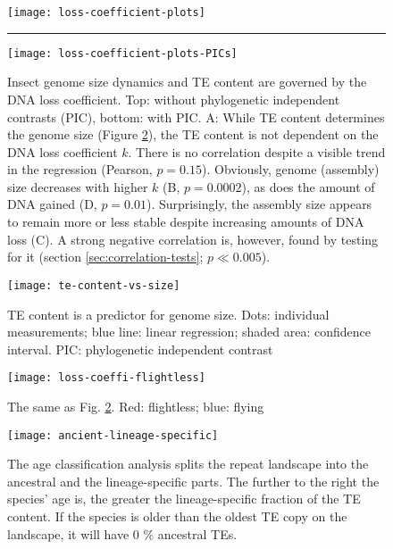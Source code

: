 \begin{figure}[h!]
\centering
\texttt{[image: loss-coefficient-plots]}
\rule{\textwidth}{0.2pt}

\bigskip

\texttt{[image: loss-coefficient-plots-PICs]}
\caption[DNA loss coefficient correlations, with and without PIC]{Insect genome size dynamics and TE content are governed by the DNA loss coefficient. Top: without phylogenetic independent contrasts (PIC), bottom: with PIC. A: While TE content determines the genome size (Figure \ref{fig:te-content-vs-size}), the TE content is not dependent on the DNA loss coefficient $k$. There is no correlation despite a visible trend in the regression (Pearson, $p = 0.15$). Obviously, genome (assembly) size decreases with higher $k$ (B, $p = 0.0002$), as does the amount of DNA gained (D, $p = 0.01$). Surprisingly, the assembly size appears to remain more or less stable despite increasing amounts of DNA loss (C). A strong negative correlation is, however, found by testing for it (section \ref{sec:correlation-tests}; $p \ll 0.005$).}
\label{fig:loss-coefficient}
\end{figure}

\begin{figure}
\centering
\texttt{[image: te-content-vs-size]}
\caption[TE content is a predictor for genome size]{TE content is a predictor for genome size. Dots: individual measurements; blue line: linear regression; shaded area: confidence interval. PIC: phylogenetic independent contrast \citep{Felsenstein1985}}
\label{fig:te-content-vs-size}
\end{figure}

\begin{figure}[h!]
\centering
\texttt{[image: loss-coeffi-flightless]}
\caption[TE content is a predictor for genome size, irrespective of flight ability]{The same as Fig. \ref{fig:te-content-vs-size}. Red: flightless; blue: flying}
\label{fig:loss-coefficient-plots-flight}
\end{figure}

\begin{figure}[h!]
\centering
\texttt{[image: ancient-lineage-specific]}
\caption[TE age classification explanation]{The age classification analysis splits the repeat landscape into the ancestral and the lineage-specific parts. The further to the right the species' age is, the greater the lineage-specific fraction of the TE content. If the species is older than the oldest TE copy on the landscape, it will have 0 \% ancestral TEs.}
\label{fig:ancient-lineage-specific}
\end{figure}

